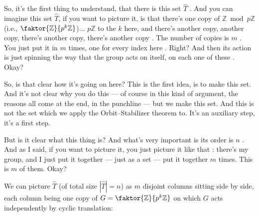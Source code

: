 \begin{proofWrapper}
\begin{speech}[00:48:14 - 00:49:30]
So, it's the first thing to understand, that there is this set $\widehat{T}$ . And you can imagine this set $\widehat{T}$, if you want to picture it, is that there's one copy of $\mathbb{Z} \bmod p \mathbb{Z}$ (i.e., $\faktor{\mathbb{Z}}{p^k\mathbb{Z}}$)... $p\mathbb{Z}$ to the $k$ here, and there's another copy, another copy, there's another copy, there's another copy . The number of copies is $m$ . You just put it in $m$ times, one for every index here . Right? And then its action is just spinning the way that the group acts on itself, on each one of these . Okay?

So, is that clear how it's going on here? This is the first idea, is to make this set. And it's not clear why you do this --- of course in this kind of argument, the reasons all come at the end, in the punchline --- but we make this set. And this is not the set which we apply the Orbit--Stabilizer theorem to. It's an auxiliary step, it's a first step.

But is it clear what this thing is? And what's very important is its order is $n$ . And as I said, if you want to picture it, you just picture it like that : there's my group, and I just put it together --- just as a set --- put it together $m$ times. This is $m$ of them. Okay?
\end{speech}

\begin{content}
We can picture $\widehat{T}$ (of total size $|\widehat{T}| = n$) as $m$ disjoint columns sitting side by side, each column being one copy of $G = \faktor{\mathbb{Z}}{p^k\mathbb{Z}}$ on which $G$ acts independently by cyclic translation:


\end{content}
\end{proofWrapper}
